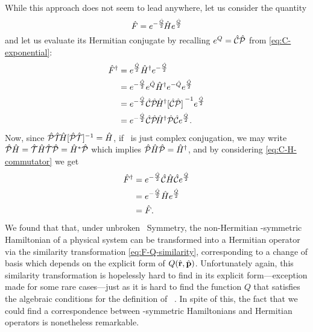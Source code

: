            While this approach does not seem to lead anywhere, let us consider the quantity
            \begin{equation}
                \label{eq:F-Q-similarity}
                \hat{F} = e^{-\frac{\hat{Q}}{2}}\!\hat{H}e^{\frac{\hat{Q}}{2}}
            \end{equation}
            and let us evaluate its Hermitian conjugate by recalling $e^{Q} = \mathcal{\hat{C}}\mathcal{\hat{P}}$ from \eqref{eq:C-exponential}:
            \begin{align*}
                \hF^\dag
                &= \myexp{\frac{\hQ}{2}} \hH^\dag \myexp{-\frac{\hQ}{2}} \\
                &= \myexp{-\frac{\hQ}{2}} \myexp{\hQ} \hH^\dag \myexp{-\hQ} \myexp{\frac{\hQ}{2}} \\
                &= \myexp{-\frac{\hQ}{2}} \hC\hP\! \hH^\dag \bqty*{\hC\hP}^{-1} \myexp{\frac{\hQ}{2}} \\
                &= \myexp{-\frac{\hQ}{2}} \hC\hP\! \hH^\dag \hP\hC \myexp{\frac{\hQ}{2}}
                \myperiod
            \end{align*}
            Now, since $\PTtransform{\hH} = \hH$, if \hT\ is just complex conjugation, we may write $\mathcal{\hat{P}}\hat{H} = \mathcal{\hat{T}}\hat{H}\mathcal{\hat{T}}\mathcal{\hat{P}} = \hat{H}^*\mathcal{\hat{P}}$ which implies $\mathcal{\hat{P}}\hat{H}\mathcal{\hat{P}} = \hat{H}^\dag$, and by considering \eqref{eq:C-H-commutator} we get \cite{bender2024}
            \begin{align*}
                \hat{F}^\dag 
                &= e^{-\frac{\hat{Q}}{2}} \mathcal{\hat{C}} \hat{H} \mathcal{\hat{C}} e^{\frac{\hat{Q}}{2}} \\
                &= e^{-\frac{\hat{Q}}{2}} \hat{H} e^{\frac{\hat{Q}}{2}} \\
                &= \hat{F}
                \text{.}
            \end{align*}
            We found that that, under unbroken \PT\ Symmetry, the non-Hermitian \PT-symmetric Hamiltonian of a physical system can be transformed into a Hermitian operator via the similarity transformation \eqref{eq:F-Q-similarity}, corresponding to a change of basis which depends on the explicit form of $Q\pqty{\hvr,\hvp}$. Unfortunately again, this similarity transformation is hopelessly hard to find in its explicit form---exception made for some rare cases---just as it is hard to find the function $Q$ that satisfies the algebraic conditions for the definition of \hC\ \cite{bender2024}. In spite of this, the fact that we could find a correspondence between \PT-symmetric Hamiltonians and Hermitian operators is nonetheless remarkable.
            
